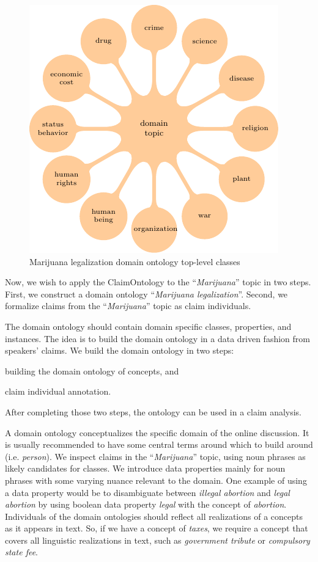 \begin{figure}
	\centering
	\includegraphics{formalizations_mindmap-figure0.pdf}
\caption{Marijuana legalization domain ontology top-level classes}
\label{fig:marijuana_domain_ontology}
\end{figure}

Now, we wish to apply the ClaimOntology to the ``\emph{Marijuana}'' topic in
two steps.  First, we construct a domain ontology ``\emph{Marijuana
legalization}''.  Second, we formalize claims from the ``\emph{Marijuana}''
topic as claim individuals. 

The domain ontology should contain domain specific classes, properties, and
instances. The idea is to build the domain ontology in a data driven 
fashion from speakers' claims. We build the domain ontology in two steps:
\begin{enumerate*}[label=(\arabic*)]
\item building the domain ontology of concepts, and 
\item claim individual annotation. 
\end{enumerate*}
After completing those two steps, the ontology can be used in a claim analysis. 

A domain ontology conceptualizes the specific domain of the online discussion. 
It is usually recommended to have some central terms around which to build
around (i.e. \emph{person}). We inspect claims in the ``\emph{Marijuana}'' topic,
using noun phrases as likely candidates for classes. We introduce
data properties mainly for noun phrases with some varying nuance relevant to
the domain. One example of using a data property would be to disambiguate between
\emph{illegal abortion} and \emph{legal abortion} by using boolean data
property \emph{legal} with the concept of \emph{abortion}.
Individuals of the domain ontologies should reflect all realizations of a concepts as
it appears in text. So, if we have a concept of \emph{taxes}, we require a concept
that covers all linguistic realizations in text, such as \emph{government tribute} or
\emph{compulsory state fee}. 

